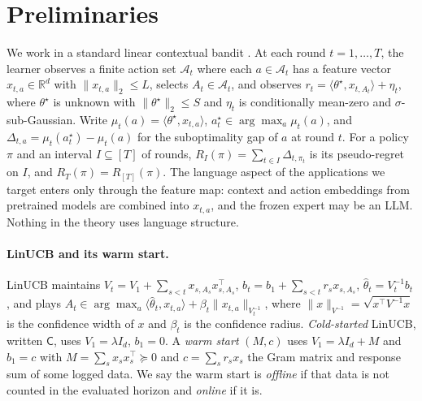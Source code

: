 \documentclass{article}
\theoremstyle{definition}
\theoremstyle{remark}
\theoremstyle{remark}
\newcommand{\Cold}{\mathsf{C}}
\begin{document}
\section{Preliminaries}
\label{sec:preliminaries}

We work in a standard linear contextual bandit
\cite{abbasi2011improved,chu2011contextual,lattimore2020bandit}. At each round
$t=1,\dots,T$, the learner observes a finite action set $\mathcal A_t$ where
each $a\in\mathcal A_t$ has a feature vector $x_{t,a}\in\mathbb R^d$ with
$\|x_{t,a}\|_2\le L$, selects $A_t\in\mathcal A_t$, and observes
$r_t=\langle\theta^\star,x_{t,A_t}\rangle+\eta_t$, where $\theta^\star$ is
unknown with $\|\theta^\star\|_2\le S$ and $\eta_t$ is conditionally mean-zero
and $\sigma$-sub-Gaussian. Write $\mu_t(a)=\langle\theta^\star,x_{t,a}\rangle$,
$a_t^\star\in\arg\max_a\mu_t(a)$, and $\Delta_{t,a}=\mu_t(a_t^\star)-\mu_t(a)$
for the suboptimality gap of $a$ at round $t$. For a policy $\pi$ and an
interval $I\subseteq[T]$ of rounds, $R_I(\pi)=\sum_{t\in I}\Delta_{t,\pi_t}$ is
its pseudo-regret on $I$, and $R_T(\pi)=R_{[T]}(\pi)$. The language aspect of
the applications we target enters only through the feature map: context and
action embeddings from pretrained models are combined into $x_{t,a}$, and the
frozen expert may be an LLM. Nothing in the theory uses language structure.

\paragraph{LinUCB and its warm start.}
LinUCB maintains $V_t=V_1+\sum_{s<t}x_{s,A_s}x_{s,A_s}^\top$,
$b_t=b_1+\sum_{s<t}r_sx_{s,A_s}$, $\widehat\theta_t=V_t^{-1}b_t$, and plays
$A_t\in\arg\max_a\langle\widehat\theta_t,x_{t,a}\rangle+\beta_t\|x_{t,a}\|_{V_t^{-1}}$,
where $\|x\|_{V^{-1}}=\sqrt{x^\top V^{-1}x}$ is the confidence width of $x$ and
$\beta_t$ is the confidence radius. \emph{Cold-started} LinUCB, written
$\Cold$, uses $V_1=\lambda I_d$, $b_1=0$. A \emph{warm start} $(M,c)$ uses
$V_1=\lambda I_d+M$ and $b_1=c$ with $M=\sum_sx_sx_s^\top\succeq0$ and
$c=\sum_sr_sx_s$ the Gram matrix and response sum of some logged data. We say
the warm start is \emph{offline} if that data is not counted in the evaluated
horizon and \emph{online} if it is.
\end{document}
